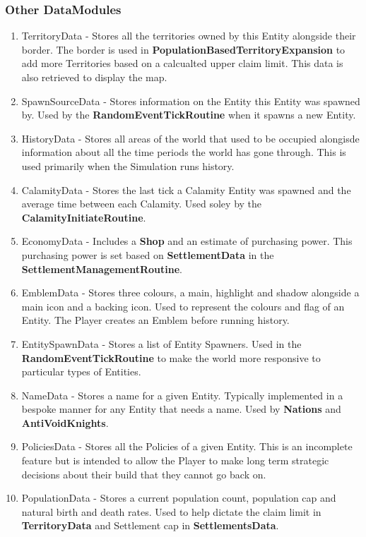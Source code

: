 \documentclass{report}
\begin{document}
\subsubsection{Other DataModules}

\begin{enumerate}

	\item TerritoryData - Stores all the territories owned by this Entity alongside their border. The border is used in \textbf{PopulationBasedTerritoryExpansion} to add more Territories based on a calcualted upper claim limit. This data is also retrieved to display the map.
	\item SpawnSourceData - Stores information on the Entity this Entity was spawned by. Used by the \textbf{RandomEventTickRoutine} when it spawns a new Entity.
	\item HistoryData - Stores all areas of the world that used to be occupied alongisde information about all the time periods the world has gone through. This is used primarily when the Simulation runs history.
	\item CalamityData - Stores the last tick a Calamity Entity was spawned and the average time between each Calamity. Used soley by the \textbf{CalamityInitiateRoutine}.
	\item EconomyData - Includes a \textbf{Shop} and an estimate of purchasing power. This purchasing power is set based on \textbf{SettlementData} in the \textbf{SettlementManagementRoutine}.
	\item EmblemData - Stores three colours, a main, highlight and shadow alongside a main icon and a backing icon. Used to represent the colours and flag of an Entity. The Player creates an Emblem before running history.
	\item EntitySpawnData - Stores a list of Entity Spawners. Used in the \textbf{RandomEventTickRoutine} to make the world more responsive to particular types of Entities.
	\item NameData - Stores a name for a given Entity. Typically implemented in a bespoke manner for any Entity that needs a name. Used by \textbf{Nations} and \textbf{AntiVoidKnights}.
	\item PoliciesData - Stores all the Policies of a given Entity. This is an incomplete feature but is intended to allow the Player to make long term strategic decisions about their build that they cannot go back on.
	\item PopulationData - Stores a current population count, population cap and natural birth and death rates. Used to help dictate the claim limit in \textbf{TerritoryData} and Settlement cap in \textbf{SettlementsData}.

\end{enumerate}
\end{document}

